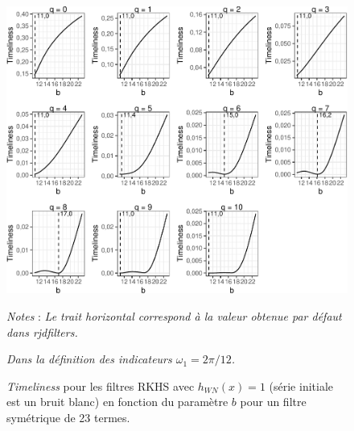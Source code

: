 \documentclass[
  11pt,
  french,
  a4paper]{article}
\newcommand\1{\mathds{1}}
\begin{document}
\begin{figure}[H]

{\centering \includegraphics{img/bookdown/pdf/rkhstimeliness11wn-1} 

}

\caption[\emph{Timeliness} pour les filtres RKHS avec \(h_{WN}(x)=1\) (série initiale est un bruit blanc) en fonction du paramètre \(b\) pour un filtre symétrique de 23 termes]{\emph{Timeliness} pour les filtres RKHS avec \(h_{WN}(x)=1\) (série initiale est un bruit blanc) en fonction du paramètre \(b\) pour un filtre symétrique de 23 termes.}\label{fig:rkhstimeliness11wn}

\footnotesize


\emph{Notes} : \emph{Le trait horizontal correspond à la valeur obtenue par défaut dans rjdfilters.}

\emph{Dans la définition des indicateurs \(\omega_1=2\pi/12\).}
\normalsize\end{figure}
\end{document}
